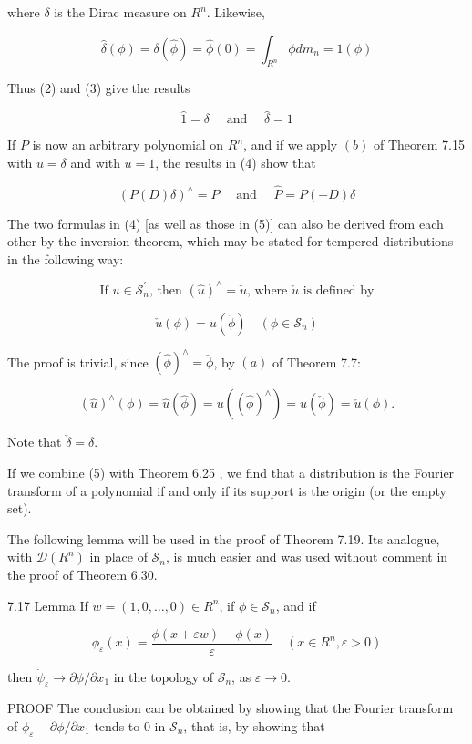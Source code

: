 \documentclass[10pt]{article}
\begin{document}
where $\delta$ is the Dirac measure on $R^{n}$. Likewise,

$$
\hat{\delta}(\phi)=\delta(\hat{\phi})=\hat{\phi}(0)=\int_{R^{n}} \phi d m_{n}=1(\phi)
$$

Thus (2) and (3) give the results

$$
\hat{1}=\delta \quad \text { and } \quad \hat{\delta}=1
$$

If $P$ is now an arbitrary polynomial on $R^{n}$, and if we apply $(b)$ of Theorem 7.15 with $u=\delta$ and with $u=1$, the results in (4) show that

$$
(P(D) \delta)^{\wedge}=P \quad \text { and } \quad \hat{P}=P(-D) \delta
$$

The two formulas in (4) [as well as those in (5)] can also be derived from each other by the inversion theorem, which may be stated for tempered distributions in the following way:

$$
\text { If } u \in \mathscr{S}_{n}^{\prime} \text {, then }(\hat{u})^{\wedge}=\check{u} \text {, where } \check{u} \text { is defined by }
$$

$$
\check{u}(\phi)=u(\check{\phi}) \quad\left(\phi \in \mathscr{S}_{n}\right)
$$

The proof is trivial, since $(\hat{\phi})^{\wedge}=\check{\phi}$, by $(a)$ of Theorem 7.7:

$$
(\hat{u})^{\wedge}(\phi)=\hat{u}(\hat{\phi})=u\left((\hat{\phi})^{\wedge}\right)=u(\check{\phi})=\check{u}(\phi) .
$$

Note that $\check{\delta}=\delta$.

If we combine (5) with Theorem 6.25 , we find that a distribution is the Fourier transform of a polynomial if and only if its support is the origin (or the empty set).

The following lemma will be used in the proof of Theorem 7.19. Its analogue, with $\mathscr{D}\left(R^{n}\right)$ in place of $\mathscr{S}_{n}$, is much easier and was used without comment in the proof of Theorem 6.30.

7.17 Lemma If $w=(1,0, \ldots, 0) \in R^{n}$, if $\phi \in \mathscr{S}_{n}$, and if

$$
\phi_{\varepsilon}(x)=\frac{\phi(x+\varepsilon w)-\phi(x)}{\varepsilon} \quad\left(x \in R^{n}, \varepsilon>0\right)
$$

then $\dot{\psi}_{\varepsilon} \rightarrow \partial \phi / \partial x_{1}$ in the topology of $\mathscr{S}_{n}$, as $\varepsilon \rightarrow 0$.

PROOF The conclusion can be obtained by showing that the Fourier transform of $\phi_{\varepsilon}-\partial \phi / \partial x_{1}$ tends to 0 in $\mathscr{S}_{n}$, that is, by showing that
\end{document}
